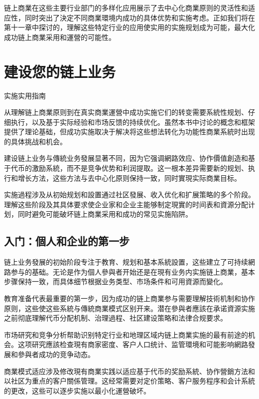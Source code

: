 \documentclass[
  Letterpaper,
]{scrbook}
\begin{document}
链上商業在这些主要行业部门的多样化应用展示了去中心化商業原则的灵活性和适应性，同时突出了決定不同商業環境内成功的具体优势和实施考虑。正如我们将在第十一章中探讨的，理解这些特定行业的应用使实用的实施规划成为可能，最大化成功链上商業采用和運營的可能性。

\chapter{建设您的链上业务}\label{sec-building-business}

实施实用指南

从理解链上商業原则到在真实商業運營中成功实施它们的转变需要系統性规划、仔细执行，以及基于实际经验和市场反馈的持续优化。虽然本书中讨论的概念和框架提供了理论基础，但成功实施取决于解决将这些想法转化为功能性商業系統时出现的具体挑战和机会。

建设链上业务与傳統业务發展显著不同，因为它强调網路效应、协作價值創造和基于代币的激励系統，而不是竞争优势和利润提取。这一根本差异需要新的规划、执行和增长方法，这些方法与去中心化原则保持一致，同时實現实际商業目标。

实施過程涉及从初始规划和設置通过社区發展、收入优化和扩展策略的多个阶段。理解这些阶段及其具体要求使企业家和企业主能够制定現實的时间表和資源分配计划，同时避免可能破坏链上商業采用和成功的常见实施陷阱。

\section{入门：個人和企业的第一步}\label{ux5165ux95e8ux500bux4ebaux548cux4f01ux4e1aux7684ux7b2cux4e00ux6b65}

链上业务發展的初始阶段专注于教育、规划和基本系統設置，这些建立了可持续網路参与的基础。无论是作为個人參與者开始还是在現有业务内实施链上商業，基本步骤保持一致，而具体细节根据业务类型、市场条件和可用資源而變化。

教育准备代表最重要的第一步，因为成功的链上商業参与需要理解技術机制和协作原则，这些使这些系統与傳統商業模式区别开来。潜在參與者應該在承诺資源实施之前彻底理解代币分配机制、治理過程、社区建设策略和法律合规要求。

市场研究和竞争分析帮助识别特定行业和地理区域内链上商業实施的最有前途的机会。这项研究應該检查現有商家密度、客户人口统计、监管環境和可能影响網路發展和參與者成功的竞争动态。

商業模式适应涉及修改現有商業实践以适应基于代币的奖励系統、协作營銷方法和以社区为重点的客户關係管理。这经常需要对定价策略、客户服务程序和会计系統的更改，这些可以逐步实施以最小化運營破坏。
\end{document}
